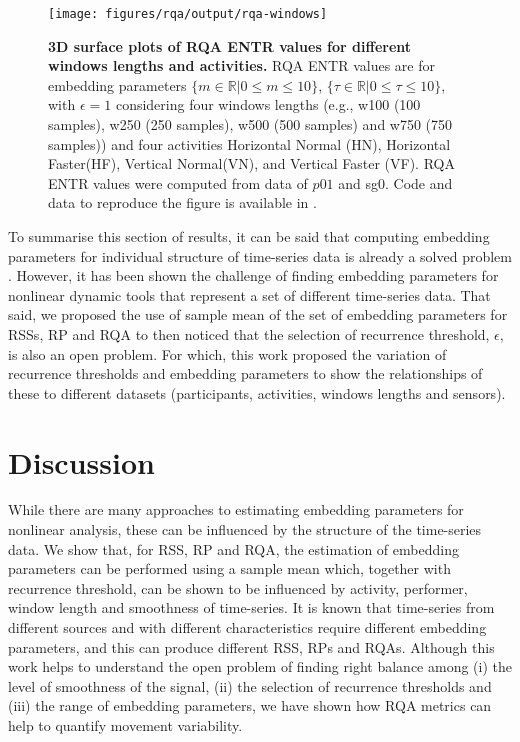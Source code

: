 \documentclass[fleqn,10pt]{wlscirep}
\begin{document}
\begin{figure}[ht]
\centering
\texttt{[image: figures/rqa/output/rqa-windows]}
    \caption{
	{\bf 3D surface plots of RQA ENTR values for different windows lengths and activities.}
	RQA ENTR values are for embedding parameters
	$ \{ m \in \mathbb{R} | 0 \le m \le 10  \}$,
	$ \{ \tau \in \mathbb{R} | 0 \le \tau \le 10  \}$, 
	with $\epsilon = 1 $ considering four 
	windows lengths (e.g., w100 (100 samples), w250 (250 samples),
	w500 (500 samples) and w750 (750 samples)) and
	four activities 
	Horizontal Normal (HN), Horizontal Faster(HF), Vertical Normal(VN), and 
	Vertical Faster (VF).
	RQA ENTR values were computed from data of $p01$ and sg0.
	Code and data to reproduce the figure is available in \cite{srep2021}.
       }
\label{fig:3dRQAENTR_windowsactivities}
\end{figure}

To summarise this section of results, it can be said that computing
embedding parameters for individual structure of time-series 
data is already a solved problem \cite{frank2010, sama2013, bradley2015}. 
However, it has been shown the challenge of finding embedding parameters
for nonlinear dynamic tools that represent a set of different time-series data.
That said, we proposed the use of sample mean of the set of embedding parameters
for RSSs, RP and RQA to then noticed that the selection of recurrence 
threshold, $\epsilon$, is also an open problem.
For which, this work proposed the variation of recurrence thresholds 
and embedding parameters to show the relationships of these to different datasets 
(participants, activities, windows lengths and sensors).

\section*{Discussion}
While there are many approaches to estimating embedding parameters for nonlinear analysis, 
these can be influenced by the structure of the time-series data.   
We show that, for RSS, RP and RQA, the estimation of embedding parameters can be performed 
using a sample mean which, together with recurrence threshold, can be shown to be 
influenced by activity, performer, window length and smoothness of time-series.  
It is known that time-series from different sources and with different characteristics 
require different embedding parameters, and this can produce different RSS, RPs and RQAs. 
Although this work helps to understand the open problem of 
finding right balance among (i) the level of smoothness of the signal, 
(ii) the selection of recurrence thresholds and (iii) 
the range of embedding parameters, 
we have shown how RQA metrics can help to quantify movement variability.
\end{document}
